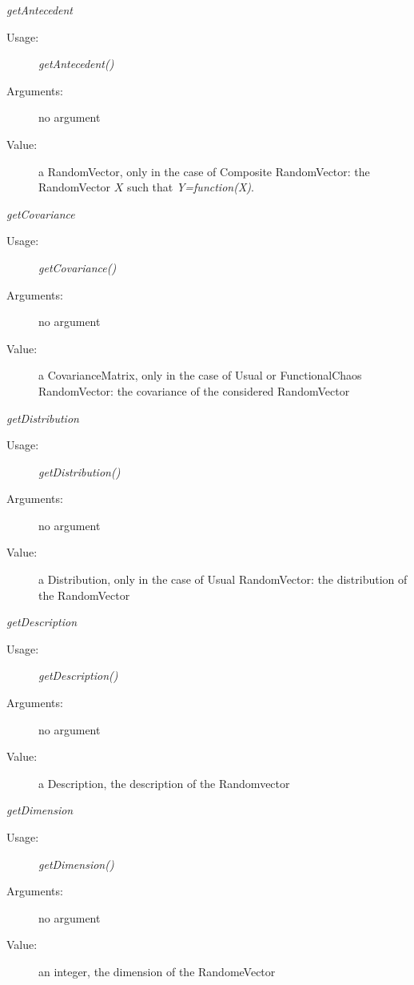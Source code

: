 \begin{description}
\item[Some methods:]  \rule{0pt}{1em}
\begin{description}
\item \textit{getAntecedent}
\begin{description}
\item[Usage:] \textit{getAntecedent()}
\item[Arguments:] no argument
\item[Value:] a RandomVector, only in the case of Composite RandomVector: the  RandomVector $X$ such that \textit{Y=function(X)}.
\end{description}
\bigskip
\item \textit{getCovariance}
\begin{description}
\item[Usage:] \textit{getCovariance()}
\item[Arguments:] no argument
\item[Value:] a CovarianceMatrix, only in the case of Usual or FunctionalChaos RandomVector: the covariance of the  considered RandomVector
\end{description}
\bigskip

\item \textit{getDistribution}
\begin{description}
\item[Usage:] \textit{getDistribution()}
\item[Arguments:] no argument
\item[Value:] a Distribution, only in the case of Usual RandomVector: the distribution of the RandomVector
\end{description}
\bigskip

\item \textit{getDescription}
\begin{description}
\item[Usage:] \textit{getDescription()}
\item[Arguments:] no argument
\item[Value:] a Description, the description of the Randomvector
\end{description}
\bigskip

\item \textit{getDimension}
\begin{description}
\item[Usage:] \textit{getDimension()}
\item[Arguments:] no argument
\item[Value:] an integer, the dimension of the RandomeVector
\end{description}
\bigskip


\end{description}
\end{description}
